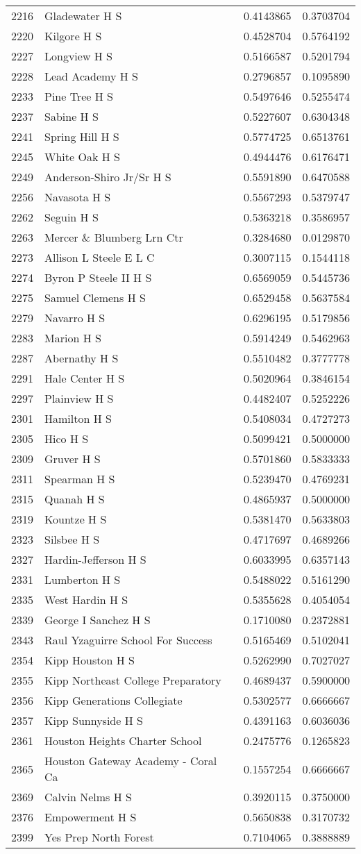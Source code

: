 \documentclass[
]{article}
\begin{document}
\begin{longtable}[]{@{}llrr@{}}
2216 & Gladewater H S & 0.4143865 & 0.3703704\tabularnewline
2220 & Kilgore H S & 0.4528704 & 0.5764192\tabularnewline
2227 & Longview H S & 0.5166587 & 0.5201794\tabularnewline
2228 & Lead Academy H S & 0.2796857 & 0.1095890\tabularnewline
2233 & Pine Tree H S & 0.5497646 & 0.5255474\tabularnewline
2237 & Sabine H S & 0.5227607 & 0.6304348\tabularnewline
2241 & Spring Hill H S & 0.5774725 & 0.6513761\tabularnewline
2245 & White Oak H S & 0.4944476 & 0.6176471\tabularnewline
2249 & Anderson-Shiro Jr/Sr H S & 0.5591890 & 0.6470588\tabularnewline
2256 & Navasota H S & 0.5567293 & 0.5379747\tabularnewline
2262 & Seguin H S & 0.5363218 & 0.3586957\tabularnewline
2263 & Mercer \& Blumberg Lrn Ctr & 0.3284680 & 0.0129870\tabularnewline
2273 & Allison L Steele E L C & 0.3007115 & 0.1544118\tabularnewline
2274 & Byron P Steele II H S & 0.6569059 & 0.5445736\tabularnewline
2275 & Samuel Clemens H S & 0.6529458 & 0.5637584\tabularnewline
2279 & Navarro H S & 0.6296195 & 0.5179856\tabularnewline
2283 & Marion H S & 0.5914249 & 0.5462963\tabularnewline
2287 & Abernathy H S & 0.5510482 & 0.3777778\tabularnewline
2291 & Hale Center H S & 0.5020964 & 0.3846154\tabularnewline
2297 & Plainview H S & 0.4482407 & 0.5252226\tabularnewline
2301 & Hamilton H S & 0.5408034 & 0.4727273\tabularnewline
2305 & Hico H S & 0.5099421 & 0.5000000\tabularnewline
2309 & Gruver H S & 0.5701860 & 0.5833333\tabularnewline
2311 & Spearman H S & 0.5239470 & 0.4769231\tabularnewline
2315 & Quanah H S & 0.4865937 & 0.5000000\tabularnewline
2319 & Kountze H S & 0.5381470 & 0.5633803\tabularnewline
2323 & Silsbee H S & 0.4717697 & 0.4689266\tabularnewline
2327 & Hardin-Jefferson H S & 0.6033995 & 0.6357143\tabularnewline
2331 & Lumberton H S & 0.5488022 & 0.5161290\tabularnewline
2335 & West Hardin H S & 0.5355628 & 0.4054054\tabularnewline
2339 & George I Sanchez H S & 0.1710080 & 0.2372881\tabularnewline
2343 & Raul Yzaguirre School For Success & 0.5165469 &
0.5102041\tabularnewline
2354 & Kipp Houston H S & 0.5262990 & 0.7027027\tabularnewline
2355 & Kipp Northeast College Preparatory & 0.4689437 &
0.5900000\tabularnewline
2356 & Kipp Generations Collegiate & 0.5302577 &
0.6666667\tabularnewline
2357 & Kipp Sunnyside H S & 0.4391163 & 0.6036036\tabularnewline
2361 & Houston Heights Charter School & 0.2475776 &
0.1265823\tabularnewline
2365 & Houston Gateway Academy - Coral Ca & 0.1557254 &
0.6666667\tabularnewline
2369 & Calvin Nelms H S & 0.3920115 & 0.3750000\tabularnewline
2376 & Empowerment H S & 0.5650838 & 0.3170732\tabularnewline
2399 & Yes Prep North Forest & 0.7104065 & 0.3888889\tabularnewline

\end{longtable}
\end{document}
